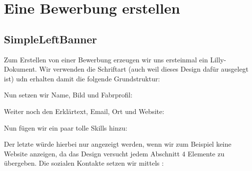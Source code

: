 \section{Eine Bewerbung erstellen}
\subsection{SimpleLeftBanner}
Zum Erstellen von einer Bewerbung erzeugen wir uns ersteinmal ein Lilly-Dokument. Wir verwenden die Schriftart  (auch weil dieses Design dafür ausgelegt ist) udn erhalten damit die folgende Grundstruktur:
Nun setzen wir Name, Bild und Fabrprofil:
\begin{latex}
\end{latex}
Weiter noch den Erklärtext, Email, Ort und Website:
\begin{latex}[firstnumber=last]
\end{latex}
Nun fügen wir ein paar tolle Skills hinzu:
\begin{latex}[firstnumber=last]
\end{latex}
Der letzte würde hierbei nur angezeigt werden, wenn wir zum Beispiel keine Website anzeigen, da das Design versucht jedem Abschnitt $4$ Elemente zu übergeben. Die sozialen Kontakte setzen wir mittels :
\begin{latex}[firstnumber=last]
\end{latex}
